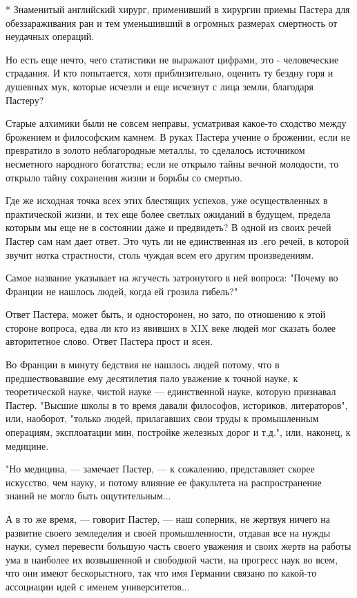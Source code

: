 * Знаменитый английский хирург, применивший в хирургии приемы Пастера
для обеззараживания ран и тем уменьшивший в огромных размерах
смертность от неудачных операций.

Но  есть  еще  нечто,  чего  статистики  не  выражают  цифрами,  это   -
человеческие страдания. И кто  попытается, хотя приблизительно,  оценить
ту бездну горя  и душевных мук,  которые исчезли и  еще исчезнут с  лица
земли, благодаря Пастеру?

Старые алхимики  были не  совсем неправы,  усматривая какое-то  сходство
между брожением и философским камнем. В руках Пастера учение о брожении,
если  не  превратило  в  золото  неблагородные  металлы,  то   сделалось
источником несметного народного богатства; если не открыло тайны  вечной
молодости, то открыло тайну сохранения жизни и борьбы со смертью.

Где же исходная точка всех этих блестящих успехов, уже осуществленных  в
практической жизни, и тех еще более светлых ожиданий в будущем,  предела
которым мы еще не в состоянии даже и предвидеть? В одной из своих  речей
Пастер сам нам дает ответ. Это чуть ли не единственная из .его речей,  в
которой  звучит  нотка  страстности,   столь  чуждая  всем  его   другим
произведениям.

Самое название указывает на жгучесть затронутого в ней вопроса:  "Почему
во Франции не нашлось людей, когда ей грозила гибель?"

Ответ Пастера, может быть, и односторонен, но зато, по отношению к  этой
стороне вопроса, едва  ли кто из  явивших в XIX  веке людей мог  сказать
более авторитетное слово. Ответ Пастера прост и ясен.

Во  Франции  в  минуту   бедствия  не  нашлось   людей  потому,  что   в
предшествовавшие  ему  десятилетия  пало  уважение  к  точной  науке,  к
теоретической  науке,  чистой  науке   ---  единственной  науке,   которую
признавал Пастер. "Высшие школы в то время давали философов,  историков,
литераторов", или,  наоборот, "только  людей, прилагавших  свои труды  к
промышленным  операциям,  эксплоатации  мин,  постройке  железных  дорог
и т.д.", или, наконец, к медицине.

"Но медицина, --- замечает Пастер, --- к сожалению, представляет скорее
искусство, чем науку, и потому влияние ее факультета на
распространение знаний не могло быть ощутительным...

А в то же время, --- говорит Пастер, --- наш соперник, не жертвуя ничего
на развитие своего земледелия и своей промышленности, отдавая все на
нужды науки, сумел перевести большую часть своего уважения и своих
жертв на работы ума в наиболее их возвышенной и свободной части, на
прогресс наук во всем, что они имеют бескорыстного, так что имя
Германии связано по какой-то ассоциации идей с именем университетов...

